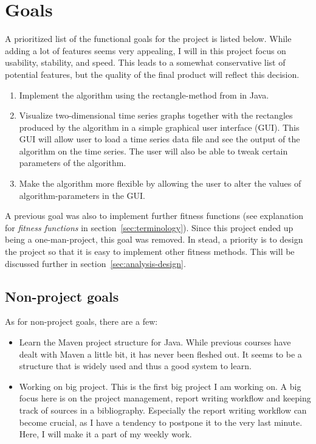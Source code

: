 
\section{Goals} \label{sec:goals}

A prioritized list of the functional goals for the project is listed below.
While adding a lot of features seems very appealing, I will in this project
focus on usability, stability, and speed. This leads to a somewhat conservative
list of potential features, but the quality of the final product will reflect
this decision. 

\begin{enumerate}
    \item Implement the algorithm using the rectangle-method from
    \cite{doerr2017a} in Java. 
    
    \item Visualize two-dimensional time series graphs together with the
    rectangles produced by the algorithm in a simple graphical user interface
    (GUI). This GUI will allow user to load a time series data file and see the
    output of the algorithm on the time series. The user will also be able to
    tweak certain parameters of the algorithm. 

    \item Make the algorithm more flexible by allowing the user to alter the
    values of algorithm-parameters in the GUI. 
\end{enumerate}

A previous goal was also to implement further fitness functions (see explanation
for \textit{fitness functions} in section~\ref{sec:terminology}). Since this
project ended up being a one-man-project, this goal was removed. In stead, a
priority is to design the project so that it is easy to implement other fitness
methods. This will be discussed further in section~\ref{sec:analysis-design}.


\subsection{Non-project goals} 

As for non-project goals, there are a few: 
\begin{itemize}

    \item Learn the Maven project structure for Java. While previous courses
    have dealt with Maven a little bit, it has never been fleshed out. It seems
    to be a structure that is widely used and thus a good system to learn. 

    \item Working on big project. This is the first big project I am working on.
    A big focus here is on the project management, report writing workflow and
    keeping track of sources in a bibliography. Especially the report writing
    workflow can become crucial, as I have a tendency to postpone it to the very
    last minute. Here, I will make it a part of my weekly work. 

\end{itemize}

